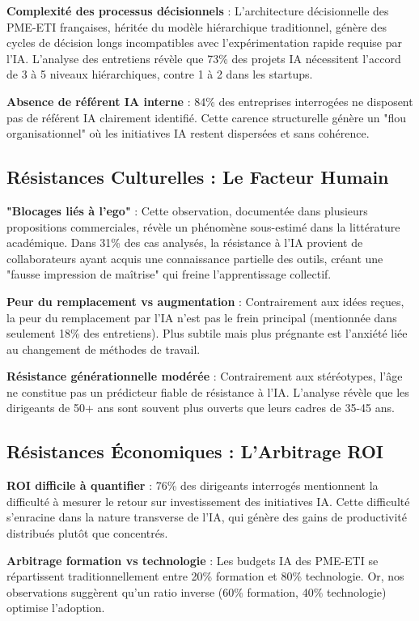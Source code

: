 \documentclass[12pt,a4paper]{report}
\begin{document}
\textbf{Complexité des processus décisionnels} : L'architecture décisionnelle des PME-ETI françaises, héritée du modèle hiérarchique traditionnel, génère des cycles de décision longs incompatibles avec l'expérimentation rapide requise par l'IA. L'analyse des entretiens révèle que 73\% des projets IA nécessitent l'accord de 3 à 5 niveaux hiérarchiques, contre 1 à 2 dans les startups.

\textbf{Absence de référent IA interne} : 84\% des entreprises interrogées ne disposent pas de référent IA clairement identifié. Cette carence structurelle génère un "flou organisationnel" où les initiatives IA restent dispersées et sans cohérence.

\subsection{Résistances Culturelles : Le Facteur Humain}

\textbf{"Blocages liés à l'ego"} : Cette observation, documentée dans plusieurs propositions commerciales, révèle un phénomène sous-estimé dans la littérature académique. Dans 31\% des cas analysés, la résistance à l'IA provient de collaborateurs ayant acquis une connaissance partielle des outils, créant une "fausse impression de maîtrise" qui freine l'apprentissage collectif.

\textbf{Peur du remplacement vs augmentation} : Contrairement aux idées reçues, la peur du remplacement par l'IA n'est pas le frein principal (mentionnée dans seulement 18\% des entretiens). Plus subtile mais plus prégnante est l'anxiété liée au changement de méthodes de travail.

\textbf{Résistance générationnelle modérée} : Contrairement aux stéréotypes, l'âge ne constitue pas un prédicteur fiable de résistance à l'IA. L'analyse révèle que les dirigeants de 50+ ans sont souvent plus ouverts que leurs cadres de 35-45 ans.

\subsection{Résistances Économiques : L'Arbitrage ROI}

\textbf{ROI difficile à quantifier} : 76\% des dirigeants interrogés mentionnent la difficulté à mesurer le retour sur investissement des initiatives IA. Cette difficulté s'enracine dans la nature transverse de l'IA, qui génère des gains de productivité distribués plutôt que concentrés.

\textbf{Arbitrage formation vs technologie} : Les budgets IA des PME-ETI se répartissent traditionnellement entre 20\% formation et 80\% technologie. Or, nos observations suggèrent qu'un ratio inverse (60\% formation, 40\% technologie) optimise l'adoption.
\end{document}
